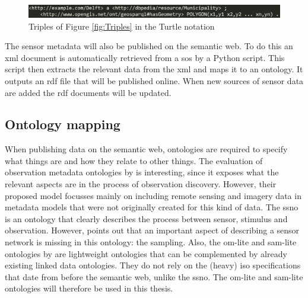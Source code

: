 \begin{figure}
	\includegraphics[width=1\linewidth]{figs/Turtle.png}
	\caption{Triples of Figure \ref{fig:Triples} in the Turtle notation}
	\label{fig:Turtle}
\end{figure}

The sensor metadata will also be published on the semantic web. To do this an \ac{xml} document is automatically retrieved from a \ac{sos} by a Python script. This script then extracts the relevant data from the \ac{xml} and maps it to an ontology. It outputs an \ac{rdf} file that will be published online. When new sources of sensor data are added the \ac{rdf} documents will be updated.   

\subsection{Ontology mapping}
When publishing data on the semantic web, ontologies are required to specify what things are and how they relate to other things. The evaluation of observation metadata ontologies by \cite{SW:Hu} is interesting, since it exposes what the relevant aspects are in the process of observation discovery. However, their proposed model focusses mainly on including remote sensing and imagery data in metadata models that were not originally created for this kind of data. The \ac{ssno} is an ontology that clearly describes the process between sensor, stimulus and observation. However, \cite{SSW:Cox4} points out that an important aspect of describing a sensor network is missing in this ontology: the sampling. Also, the om-lite and sam-lite ontologies by \cite{SSW:Cox4} are lightweight ontologies that can be complemented by already existing linked data ontologies. They do not rely on the (heavy) \ac{iso} specifications that date from before the semantic web, unlike the \ac{ssno}. The om-lite and sam-lite ontologies will therefore be used in this thesis. 

